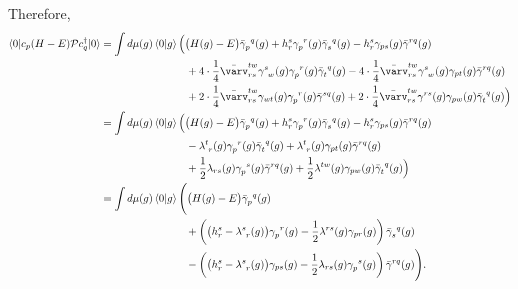 \documentclass[11pt,letterpaper]{article}
\begin{document}
Therefore,
\begin{subequations}
\begin{align}
  \nonumber
  \braket{0|c_p (H - E) \mathcal{P} c^\dag_q|0}
  &= \int d\mu(g) \braket{0|g}
  \Bigl(
    \big(H(g) - E\big) \bar{\gamma}_{p\phantom{q}}^{\phantom{p}q}(g)
    + h_r^s \gamma_{p\phantom{r}}^{\phantom{p}r}(g) \bar{\gamma}_{s\phantom{q}}^{\phantom{s}q}(g) 
    - h_r^s \gamma_{ps}(g) \bar{\gamma}^{rq}(g)\\
    \nonumber
    &\hspace{8em}+ 4 \cdot \frac{1}{4} \bar{\varv}_{rs}^{tw}
    \gamma^{s\phantom{w}}_{\phantom{s}w}(g) 
    \gamma_{p\phantom{r}}^{\phantom{p}r}(g) 
    \bar{\gamma}_{t\phantom{q}}^{\phantom{t}q}(g) 
    - 4 \cdot \frac{1}{4} \bar{\varv}_{rs}^{tw}
    \gamma^{s\phantom{w}}_{\phantom{s}w}(g) 
    \gamma_{pt}(g) 
    \bar{\gamma}^{rq}(g)\\
    &\hspace{8em}+ 2 \cdot \frac{1}{4} \bar{\varv}_{rs}^{tw}
    \gamma_{wt}(g)
    \gamma_{p\phantom{r}}^{\phantom{p}r}(g)
    \bar{\gamma}^{sq}(g)
    + 2 \cdot \frac{1}{4} \bar{\varv}_{rs}^{tw}
    \gamma^{rs}(g)
    \gamma_{pw}(g)
    \bar{\gamma}_{t\phantom{q}}^{\phantom{t}q}(g)
  \Bigr)\\
  \nonumber
  &= \int d\mu(g) \braket{0|g}
  \Bigl(
    \big(H(g) - E\big) \bar{\gamma}_{p\phantom{q}}^{\phantom{p}q}(g)
    + h_r^s \gamma_{p\phantom{r}}^{\phantom{p}r}(g) \bar{\gamma}_{s\phantom{q}}^{\phantom{s}q}(g) 
    - h_r^s \gamma_{ps}(g) \bar{\gamma}^{rq}(g)\\
    \nonumber
    &\hspace{8em}- \lambda^{t\phantom{r}}_{\phantom{t}r}(g) 
    \gamma_{p\phantom{r}}^{\phantom{p}r}(g) \bar{\gamma}_{t\phantom{q}}^{\phantom{t}q}(g)
    + \lambda^{t\phantom{r}}_{\phantom{t}r}(g) 
    \gamma_{pt}(g) \bar{\gamma}^{rq}(g)\\
    &\hspace{8em}+ \frac{1}{2} \lambda_{rs}(g)
    \gamma_{p\phantom{s}}^{\phantom{p}s}(g)
    \bar{\gamma}^{rq}(g)
    + \frac{1}{2} \lambda^{tw}(g)
    \gamma_{pw}(g)
    \bar{\gamma}_{t\phantom{q}}^{\phantom{t}q}(g)
  \Bigr)\\
  \nonumber
  &= \int d\mu(g) \braket{0|g}
  \Biggl(
    \big(H(g) - E\big) \bar{\gamma}_{p\phantom{q}}^{\phantom{p}q}(g)\\
    \nonumber
    &\hspace{8em}
    + \left(
      \big(h_r^s - \lambda^{s\phantom{r}}_{\phantom{s}r}(g)\big)
      \gamma_{p\phantom{r}}^{\phantom{p}r}(g)
      - \frac{1}{2} \lambda^{rs}(g) \gamma_{pr}(g)
    \right)
      \bar{\gamma}_{s\phantom{q}}^{\phantom{s}q}(g)\\
    &\hspace{8em}
    - \left(
      \big(h_r^s - \lambda^{s\phantom{r}}_{\phantom{s}r}(g)\big)
      \gamma_{ps}(g)
      - \frac{1}{2} \lambda_{rs}(g) \gamma_{p\phantom{s}}^{\phantom{p}s}(g)
    \right)
    \bar{\gamma}^{rq}(g)
  \Biggr).
\end{align}
\end{subequations}
\end{document}
